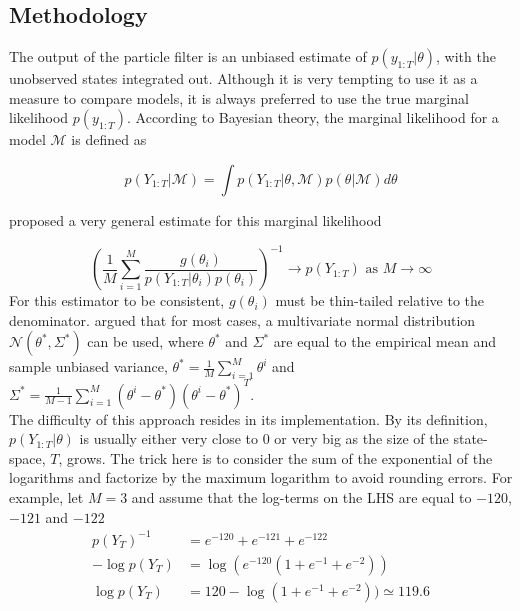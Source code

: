 \documentclass[11pt,a4,twosided,singlespacing,titlepagenumber=on]{scrreprt}
\numberwithin{equation}{chapter} %
\theoremstyle{remark}
\begin{document}
\subsection{Methodology}

The output of the particle filter is an unbiased estimate of $p(y_{1:T}|\theta)$, with the unobserved states integrated out. Although it is very tempting to use it as a measure to compare models, it is always preferred to use the true marginal likelihood $p(y_{1:T})$. According to Bayesian theory, the marginal likelihood for a model $\mathcal{M}$ is defined as

\begin{equation}
p(Y_{1:T} | \mathcal{M}) = \int p(Y_{1:T} | \theta, \mathcal{M}) p(\theta | \mathcal{M}) d\theta
\end{equation}


\cite{gelfand1994} proposed a very general estimate for this marginal likelihood

\begin{equation}
\left(\frac{1}{M} \sum_{i=1}^M \frac{g(\theta_i)}{p(Y_{1:T} | \theta_i) p(\theta_i)}\right)^{-1} \rightarrow p(Y_{1:T}) \text{ as } M \rightarrow \infty
\end{equation}
For this estimator to be consistent, $g(\theta_i)$ must be thin-tailed relative to the denominator. \cite{gelfand1994} argued that for most cases, a multivariate normal distribution $\mathcal{N}(\theta^*, \Sigma^*)$ can be used, where $\theta^*$ and $\Sigma^*$ are equal to the empirical mean and sample unbiased variance, $\theta^* = \frac{1}{M} \sum_{i=1}^M \theta^i$ and $\Sigma^* = \frac{1}{M-1} \sum_{i=1}^M \left(\theta^i - \theta^*\right)\left(\theta^i - \theta^*\right)^T$. \\


The difficulty of this approach resides in its implementation. By its definition, $p(Y_{1:T} | \theta)$ is usually either very close to 0 or very big as the size of the state-space, $T$, grows. The trick here is to consider the sum of the exponential of the logarithms and factorize by the maximum logarithm to avoid rounding errors. For example, let $M = 3$ and assume that the log-terms on the LHS are equal to $-120$, $-121$ and $-122$
\begin{align*}
p(Y_T)^{-1} &= e^{-120} + e^{-121} + e^{-122} \\
- \log p(Y_T) &= \log (e^{-120} ( 1 + e^{-1} + e^{-2})) \\
 \log p(Y_T) &= 120 - \log ( 1 + e^{-1} + e^{-2})) \simeq 119.6
\end{align*}
\end{document}
